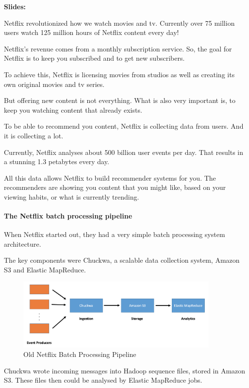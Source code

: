 \documentclass[12pt, numbers=noenddot]{scrreprt} %
\begin{document}
\textbf{Slides:}

Netflix revolutionized how we watch movies and tv. Currently over 75 million users watch 125 million hours of Netflix content every day!

Netflix’s revenue comes from a monthly subscription service. So, the goal for Netflix is to keep you subscribed and to get new subscribers.

To achieve this, Netflix is licensing movies from studios as well as creating its own original movies and tv series.

But offering new content is not everything. What is also very important is, to keep you watching content that already exists.

To be able to recommend you content, Netflix is collecting data from users. And it is collecting a lot.

Currently, Netflix analyses about 500 billion user events per day. That results in a stunning 1.3 petabytes every day.

All this data allows Netflix to build recommender systems for you. The recommenders are showing you content that you might like, based on your viewing habits, or what is currently trending.

\paragraph{The Netflix batch processing pipeline}
When Netflix started out, they had a very simple batch processing system architecture.

The key components were Chuckwa, a scalable data collection system, Amazon S3 and Elastic MapReduce.

\begin{figure}[htbp]
  \centering
     \includegraphics[width=0.9\textwidth]{images/Netflix-Chuckwa-Pipeline}
  \caption{Old Netflix Batch Processing Pipeline}
  \label{fig:Bild1}
\end{figure}

Chuckwa wrote incoming messages into Hadoop sequence files, stored in Amazon S3. These files then could be analysed by Elastic MapReduce jobs.
\end{document}
